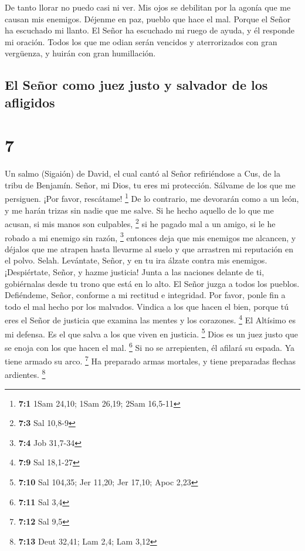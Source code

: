  De tanto llorar no puedo casi ni ver. Mis ojos se debilitan
por la agonía que me causan mis enemigos.  Déjenme en paz,
pueblo que hace el mal. Porque el Señor ha escuchado mi llanto.
 El Señor ha escuchado mi ruego de ayuda, y él responde mi
oración.  Todos los que me odian serán vencidos y
aterrorizados con gran vergüenza, y huirán con gran humillación.

\hypertarget{el-seuxf1or-como-juez-justo-y-salvador-de-los-afligidos}{%
\subsection{El Señor como juez justo y salvador de los
afligidos}\label{el-seuxf1or-como-juez-justo-y-salvador-de-los-afligidos}}

\hypertarget{section-6}{%
\section{7}\label{section-6}}

Un salmo (Sigaión) de David, el cual cantó al Señor refiriéndose a Cus,
de la tribu de Benjamín.  Señor, mi Dios, tu eres mi
protección. Sálvame de los que me persiguen. ¡Por favor, rescátame!
\footnote{\textbf{7:1} 1Sam 24,10; 1Sam 26,19; 2Sam 16,5-11}
 De lo contrario, me devorarán como a un león, y me harán
trizas sin nadie que me salve.  Si he hecho aquello de lo
que me acusan, si mis manos son culpables, \footnote{\textbf{7:3} Sal
  10,8-9}  si he pagado mal a un amigo, si le he robado a mi
enemigo sin razón, \footnote{\textbf{7:4} Job 31,7-34} 
entonces deja que mis enemigos me alcancen, y déjalos que me atrapen
hasta llevarme al suelo y que arrastren mi reputación en el polvo.
Selah.  Levántate, Señor, y en tu ira álzate contra mis
enemigos. ¡Despiértate, Señor, y hazme justicia!  Junta a
las naciones delante de ti, gobiérnalas desde tu trono que está en lo
alto.  El Señor juzga a todos los pueblos. Defiéndeme,
Señor, conforme a mi rectitud e integridad.  Por favor,
ponle fin a todo el mal hecho por los malvados. Vindica a los que hacen
el bien, porque tú eres el Señor de justicia que examina las mentes y
los corazones. \footnote{\textbf{7:9} Sal 18,1-27}  El
Altísimo es mi defensa. Es el que salva a los que viven en justicia.
\footnote{\textbf{7:10} Sal 104,35; Jer 11,20; Jer 17,10; Apoc 2,23}
 Dios es un juez justo que se enoja con los que hacen el
mal. \footnote{\textbf{7:11} Sal 3,4}  Si no se
arrepienten, él afilará su espada. Ya tiene armado su arco. \footnote{\textbf{7:12}
  Sal 9,5}  Ha preparado armas mortales, y tiene preparadas
flechas ardientes. \footnote{\textbf{7:13} Deut 32,41; Lam 2,4; Lam 3,12}

